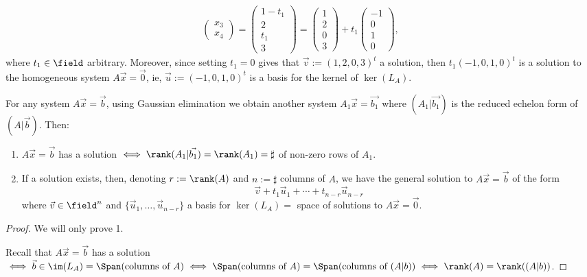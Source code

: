 \begin{example}
\begin{align*}
\begin{pmatrix}
            x_3\\
            x_4
        \end{pmatrix} = \begin{pmatrix}
            1 - t_1\\
            2\\
            t_1\\
            3
        \end{pmatrix} = \begin{pmatrix}
            1\\
            2\\
            0\\
            3
        \end{pmatrix} + t_1\begin{pmatrix}
            -1\\
            0\\
            1\\
            0
        \end{pmatrix},
    \end{align*}
    where $t_1 \in \field$ arbitrary. Moreover, since setting $t_1 = 0$ gives that $\vec{v} := (1, 2, 0, 3)^t$ a solution, then $t_1 (-1, 0, 1, 0)^t$ is a solution to the homogeneous system $A \vec{x} = \vec{0}$, ie, $\vec{u} := (-1, 0, 1, 0)^t$ is a basis for the kernel of $\ker(L_A)$.
\end{example}

\begin{theorem}
    For any system $A \vec{x} = \vec{b}$, using Gaussian elimination we obtain another system $A_1 \vec{x}=\vec{b_1}$ where $(A_1 \vert \vec{b_1})$ is the reduced echelon form of $(A \vert \vec{b})$. Then:
    \begin{enumerate}
        \item $A \vec{x} = \vec{b}$ has a solution $\iff \rank(A_1 \vert \vec{b_1}) = \rank(A_1) = \sharp $ of non-zero rows of $A_1$.
        \item If a solution exists, then, denoting $r := \rank(A)$ and $n := \sharp$ columns of $A$, we have the general solution to $A \vec{x} = \vec{b}$ of the form $$\vec{v} + t_1 \vec{u}_1 + \cdots + t_{n-r} \vec{u}_{n-r}$$ where $\vec{v} \in \field^n$ and $\{\vec{u}_1, \dots, \vec{u}_{n-r}\}$ a basis for $\ker(L_A) = $ space of solutions to $A \vec{x} = \vec{0}$.
    \end{enumerate}
\end{theorem}

\begin{proof}
    We will only prove 1.

    Recall that $A \vec{x} = \vec{b}$ has a solution $\iff \vec{b} \in \im(L_A) = \Span(\text{columns of } A) \iff  \Span(\text{columns of } A) = \Span(\text{columns of } (A \vert b)) \iff \rank(A) = \rank((A \vert b))$.
\end{proof}

